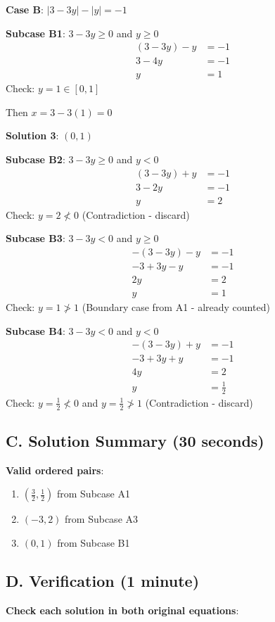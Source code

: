 \documentclass[]{article}
\begin{document}
\begin{solutionbox}
\textbf{Case B}: $|3-3y| - |y| = -1$

\quad \textbf{Subcase B1}: $3-3y \geq 0$ and $y \geq 0$
\begin{align*}
(3-3y) - y &= -1\\
3 - 4y &= -1\\
y &= 1
\end{align*}
Check: $y = 1 \in [0,1]$ \checkmark

Then $x = 3 - 3(1) = 0$

\textbf{Solution 3}: $(0, 1)$

\quad \textbf{Subcase B2}: $3-3y \geq 0$ and $y < 0$
\begin{align*}
(3-3y) + y &= -1\\
3 - 2y &= -1\\
y &= 2
\end{align*}
Check: $y = 2 \not< 0$ \texttimes \quad (Contradiction - discard)

\quad \textbf{Subcase B3}: $3-3y < 0$ and $y \geq 0$
\begin{align*}
-(3-3y) - y &= -1\\
-3 + 3y - y &= -1\\
2y &= 2\\
y &= 1
\end{align*}
Check: $y = 1 \not> 1$ \texttimes \quad (Boundary case from A1 - already counted)

\quad \textbf{Subcase B4}: $3-3y < 0$ and $y < 0$
\begin{align*}
-(3-3y) + y &= -1\\
-3 + 3y + y &= -1\\
4y &= 2\\
y &= \frac{1}{2}
\end{align*}
Check: $y = \frac{1}{2} \not< 0$ and $y = \frac{1}{2} \not> 1$ \texttimes \quad (Contradiction - discard)

\subsection*{C. Solution Summary (30 seconds)}
\textbf{Valid ordered pairs}:
\begin{enumerate}
    \item $\left(\frac{3}{2}, \frac{1}{2}\right)$ from Subcase A1
    \item $(-3, 2)$ from Subcase A3
    \item $(0, 1)$ from Subcase B1
\end{enumerate}

\subsection*{D. Verification (1 minute)}
\textbf{Check each solution in both original equations}:


\end{solutionbox}
\end{document}
